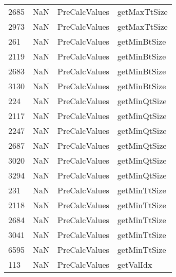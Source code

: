 \begin{tabular}{llll}
2685 &                   NaN &              PreCalcValues &                              getMaxTtSize \\
2973 &                   NaN &              PreCalcValues &                              getMaxTtSize \\
261  &                   NaN &              PreCalcValues &                              getMinBtSize \\
2119 &                   NaN &              PreCalcValues &                              getMinBtSize \\
2683 &                   NaN &              PreCalcValues &                              getMinBtSize \\
3130 &                   NaN &              PreCalcValues &                              getMinBtSize \\
224  &                   NaN &              PreCalcValues &                              getMinQtSize \\
2117 &                   NaN &              PreCalcValues &                              getMinQtSize \\
2247 &                   NaN &              PreCalcValues &                              getMinQtSize \\
2687 &                   NaN &              PreCalcValues &                              getMinQtSize \\
3020 &                   NaN &              PreCalcValues &                              getMinQtSize \\
3294 &                   NaN &              PreCalcValues &                              getMinQtSize \\
231  &                   NaN &              PreCalcValues &                              getMinTtSize \\
2118 &                   NaN &              PreCalcValues &                              getMinTtSize \\
2684 &                   NaN &              PreCalcValues &                              getMinTtSize \\
3041 &                   NaN &              PreCalcValues &                              getMinTtSize \\
6595 &                   NaN &              PreCalcValues &                              getMinTtSize \\
113  &                   NaN &              PreCalcValues &                                 getValIdx \\

\end{tabular}
